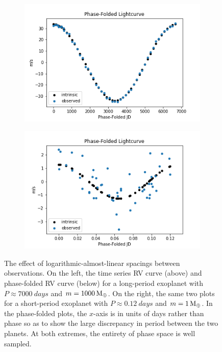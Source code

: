 \documentclass[12pt,manuscript]{aastex}
\begin{document}
\begin{figure}[ht]
  
  \begin{subfigure}[b]{.45\linewidth}
  \includegraphics[width=\linewidth]{../figures/long_P_folded}
  \end{subfigure}
  \begin{subfigure}[b]{.45\linewidth}
  \includegraphics[width=\linewidth]{../figures/short_P_folded}
  \end{subfigure}

  \caption{The effect of logarithmic-almost-linear spacings between observations. On the left, the time series RV curve (above) and phase-folded RV curve (below) for a long-period exoplanet with $P \approx \SI{7000}{days}$ and $m = \SI{1000}{M_\oplus}$. On the right, the same two plots for a short-period exoplanet with $P \approx \SI{0.12}{days}$ and $m=\SI{1}{M_\oplus}$. In the phase-folded plots, the $x$-axis is in units of days rather than phase so as to show the large discrepancy in period between the two planets.  At both extremes, the entirety of phase space is well sampled.}
  \label{fig: periods}
\end{figure}
\end{document}
